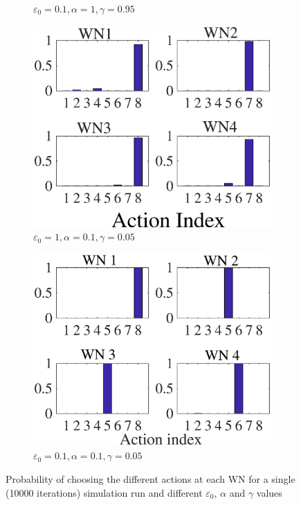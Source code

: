 \documentclass[conference]{IEEEtran}
\begin{document}
\begin{figure}[h!]
\begin{subfigure}[b]{0.225\textwidth}
			\caption{$\varepsilon_0=0.1, \alpha=1, \gamma=0.95$}
			\label{fig:e_1_a_1_g_095}
		\end{subfigure}
		\begin{subfigure}[b]{0.225\textwidth}
			\includegraphics[width=\textwidth]{images/e_1_a_01_g_005}
			\caption{$\varepsilon_0=1, \alpha=0.1, \gamma=0.05$}
			\label{fig:e_1_a_01_g_005}
		\end{subfigure}
		\begin{subfigure}[b]{0.225\textwidth}
			\includegraphics[width=\textwidth]{images/e_01_a_01_g_005}
			\caption{$\varepsilon_0=0.1, \alpha=0.1, \gamma=0.05$}
			\label{fig:e_01_a_01_g_005}
		\end{subfigure}
		\caption{Probability of choosing the different actions at each WN for a single (10000 iterations) simulation run and different $\varepsilon_0$, $\alpha$ and $\gamma$ values}
		\label{fig:ql_params_eval_actions_prob}
	\end{figure}
	
\end{document}
